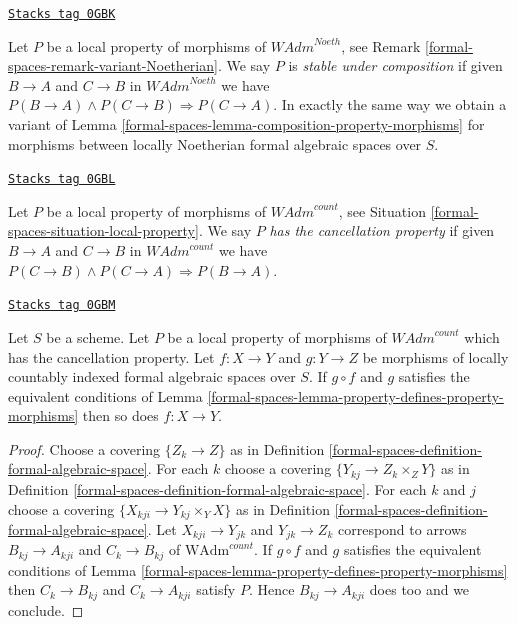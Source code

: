 \begin{remark}

\label{formal-spaces-remark-composition-variant-Noetherian}
\href{https://stacks.math.columbia.edu/tag/0GBK}{\texttt{Stacks tag 0GBK}}

Let $P$ be a local property of morphisms of $\textit{WAdm}^{Noeth}$, see
Remark \ref{formal-spaces-remark-variant-Noetherian}. We say $P$ is
{\it stable under composition} if given $B \to A$ and $C \to B$
in $\textit{WAdm}^{Noeth}$ we have
$P(B \to A) \wedge P(C \to B) \Rightarrow P(C \to A)$.
In exactly the same way we obtain a variant of
Lemma \ref{formal-spaces-lemma-composition-property-morphisms}
for morphisms between locally Noetherian formal algebraic spaces over $S$.
\end{remark}

\begin{definition}
\label{formal-spaces-situation-permanence-local-property}
\href{https://stacks.math.columbia.edu/tag/0GBL}{\texttt{Stacks tag 0GBL}}

Let $P$ be a local property of morphisms of $\textit{WAdm}^{count}$, see
Situation \ref{formal-spaces-situation-local-property}. We say $P$
{\it has the cancellation property}
if given $B \to A$ and $C \to B$ in $\textit{WAdm}^{count}$
we have $P(C \to B) \wedge P(C \to A) \Rightarrow P(B \to A)$.
\end{definition}

\begin{lemma}
\label{formal-spaces-lemma-permanence-property-morphisms}
\href{https://stacks.math.columbia.edu/tag/0GBM}{\texttt{Stacks tag 0GBM}}

Let $S$ be a scheme. Let $P$ be a local property of morphisms of
$\textit{WAdm}^{count}$ which has the cancellation property.
Let $f : X \to Y$ and $g : Y \to Z$ be morphisms of locally countably indexed
formal algebraic spaces over $S$. If $g \circ f$ and $g$
satisfies the equivalent conditions of
Lemma \ref{formal-spaces-lemma-property-defines-property-morphisms}
then so does $f : X \to Y$.
\end{lemma}

\begin{proof}
Choose a covering $\{Z_k \to Z\}$ as in
Definition \ref{formal-spaces-definition-formal-algebraic-space}.
For each $k$ choose a covering $\{Y_{kj} \to Z_k \times_Z Y\}$
as in Definition \ref{formal-spaces-definition-formal-algebraic-space}.
For each $k$ and $j$ choose a covering $\{X_{kji} \to Y_{kj} \times_Y X\}$
as in Definition \ref{formal-spaces-definition-formal-algebraic-space}.
Let $X_{kji} \to Y_{jk}$ and $Y_{jk} \to Z_k$
correspond to arrows
$B_{kj} \to A_{kji}$ and $C_k \to B_{kj}$ of
$\text{WAdm}^{count}$.
If $g \circ f$ and $g$ satisfies the equivalent conditions of
Lemma \ref{formal-spaces-lemma-property-defines-property-morphisms}
then $C_k \to B_{kj}$ and $C_k \to A_{kji}$ satisfy $P$.
Hence $B_{kj} \to A_{kji}$ does too and we conclude.
\end{proof}

